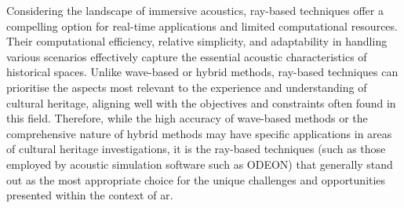Considering the landscape of immersive acoustics, ray-based techniques offer a compelling option for real-time applications and limited computational resources. Their computational efficiency, relative simplicity, and adaptability in handling various scenarios effectively capture the essential acoustic characteristics of historical spaces. Unlike wave-based or hybrid methods, ray-based techniques can prioritise the aspects most relevant to the experience and understanding of cultural heritage, aligning well with the objectives and constraints often found in this field. Therefore, while the high accuracy of wave-based methods or the comprehensive nature of hybrid methods may have specific applications in areas of cultural heritage investigations, it is the ray-based techniques (such as those employed by acoustic simulation software such as ODEON) that generally stand out as the most appropriate choice for the unique challenges and opportunities presented within the context of \acrshort{ar}.

